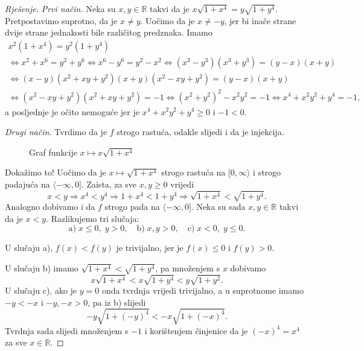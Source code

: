 \begin{proof}[Rješenje]
\textit{Prvi način.} Neka su $x, y\in \mathbb{R}$ takvi da je $x\sqrt{1+x^4}=y\sqrt{1+y^4}$. Pretpostavimo suprotno, da je $x\neq y$. Uočimo da je $x\neq -y$, jer bi inače strane dvije strane jednakosti bile različitog predznaka. Imamo
\begin{gather*}
x^2(1+x^4)=y^2(1+y^4)\\
\Leftrightarrow x^2+x^6=y^2+y^6\Leftrightarrow x^6-y^6=y^2-x^2
\Leftrightarrow (x^3-y^3)(x^3+y^3)=(y-x)(x+y)\\
\Leftrightarrow (x-y)(x^2+xy+y^2)(x+y)(x^2-xy+y^2)=(y-x)(x+y)\\
\Leftrightarrow (x^2-xy+y^2)(x^2+xy+y^2)=-1
\Leftrightarrow (x^2+y^2)^2-x^2y^2=-1
\Leftrightarrow x^4+x^2y^2+y^4=-1,
\end{gather*}
a posljednje je očito nemoguće jer je $x^4+x^2y^2+y^4\geq 0$ i $-1<0$.

\textit{Drugi način.} Tvrdimo da je $f$ strogo rastuća, odakle slijedi i da je injekcija.
\begin{figure}[ht]
\begin{center}
\end{center}
\caption{\label{gr4} Graf funkcije \(x\mapsto x\sqrt{1+x^4}\)}
\end{figure}

Dokažimo to! Uočimo da je \(x\mapsto \sqrt{1+x^4}\) strogo rastuća na \([0, \infty\rangle\) i strogo padajuća na \(\langle-\infty, 0]\). Zaista, za sve \(x, y\geq 0\) vrijedi
\[x<y\Rightarrow x^4<y^4\Rightarrow 1+x^4<1+y^4\Rightarrow \sqrt{1+x^4}<\sqrt{1+y^4}.\]
Analogno dobivamo i da \(f\) strogo pada na \(\langle-\infty, 0]\). Neka su sada \(x, y\in \mathbb{R}\) takvi da je \(x<y\). Razlikujemo tri slučaja:
\[\text{a)}\; x\leq 0,\; y>0, \quad \text{b)}\; x, y>0, \quad \text{c)}\; x<0,\; y\leq 0.\]

U slučaju a), \(f(x)<f(y)\) je trivijalno, jer je \(f(x)\leq 0\) i \(f(y)>0\). 

U slučaju b) imamo \(\sqrt{1+x^4}<\sqrt{1+y^4}\), pa množenjem s $x$ dobivamo \[x\sqrt{1+x^4}<x\sqrt{1+y^4}<y\sqrt{1+y^2}.\]
U slučaju c), ako je $y=0$ onda tvrdnja vrijedi trivijalno, a u suprotnome imamo \(-y<-x\) i \(-y, -x>0\), pa iz b) slijedi \[-y\sqrt{1+(-y)^4}<-x\sqrt{1+(-x)^4}.\] Tvrdnja sada slijedi množenjem s \(-1\) i korištenjem činjenice da je \((-x)^4=x^4\) za sve \(x\in \mathbb{R}\).
\end{proof}
